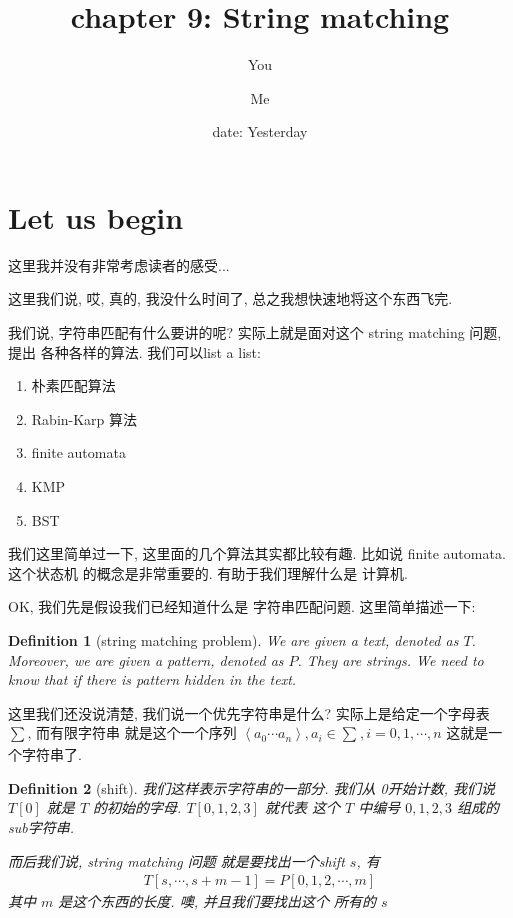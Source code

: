 \documentclass[a4paper, 10pt]{ctexart} %
\title{chapter 9: String matching}
\author{You \and Me}
\date{date: Yesterday}
\newtheorem{definition}{Definition}
\begin{document}
\maketitle
\tableofcontents
\newpage

\section{Let us begin}
这里我并没有非常考虑读者的感受...

这里我们说, 哎, 真的, 我没什么时间了, 
总之我想快速地将这个东西飞完. 

我们说, 字符串匹配有什么要讲的呢? 
实际上就是面对这个 string matching 问题, 提出
各种各样的算法.
我们可以list a list: 
\begin{enumerate}
    \item 朴素匹配算法
    \item Rabin-Karp 算法
    \item finite automata 
    \item KMP 
    \item BST
\end{enumerate}

我们这里简单过一下, 
这里面的几个算法其实都比较有趣.
比如说 finite automata. 这个状态机
的概念是非常重要的. 有助于我们理解什么是
计算机. 

OK, 我们先是假设我们已经知道什么是
字符串匹配问题. 这里简单描述一下:
\begin{definition}[string matching problem]
We are given a text, denoted as $T$. Moreover, 
we are given a pattern, denoted as $P$. 
They are strings. We need to know that 
if there is pattern hidden in 
the text. 
\end{definition}
这里我们还没说清楚, 我们说一个优先字符串是什么? 
实际上是给定一个字母表 $\sum $, 而有限字符串
就是这个一个序列 $\left<a_{0}\cdots a_{n}\right> , a_{i} \in \sum_{}, i =0 , 1, \cdots , n$ 
这就是一个字符串了.
\begin{definition}[shift]
我们这样表示字符串的一部分. 我们从
0开始计数, 我们说 $T\left[ 0 \right]$ 
就是 $T$ 的初始的字母. $T\left[ 0 , 1, 2 ,3 \right]$ 就代表
这个 $T$ 中编号 $0 , 1, 2 , 3$ 组成的sub字符串.

而后我们说, string matching 问题
就是要找出一个shift $s$, 有 
\begin{align*}
    T[s,\cdots , s+m-1] = P[0,1,2,\cdots ,m]
\end{align*}
其中 $m$ 是这个东西的长度. 噢, 并且我们要找出这个
所有的 $s$
\end{definition}
\end{document}
